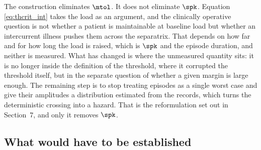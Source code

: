 \begin{remark}
\label{rem:intrinsic_limit}
The construction eliminates $\mtol$. It does not eliminate $\spk$. Equation
\eqref{eq:thcrit_int} takes the load as an argument, and the clinically operative question
is not whether a patient is maintainable at baseline load but whether an intercurrent
illness pushes them across the separatrix. That depends on how far and for how long the
load is raised, which is $\spk$ and the episode duration, and neither is measured. What has
changed is where the unmeasured quantity sits: it is no longer inside the definition of the
threshold, where it corrupted the threshold itself, but in the separate question of whether
a given margin is large enough. The remaining step is to stop treating episodes as a single
worst case and give their amplitudes a distribution estimated from the records, which turns
the deterministic crossing into a hazard. That is the reformulation set out in Section~7,
and only it removes $\spk$.
\end{remark}

\subsection{What would have to be established}
\label{sec:notworking}

